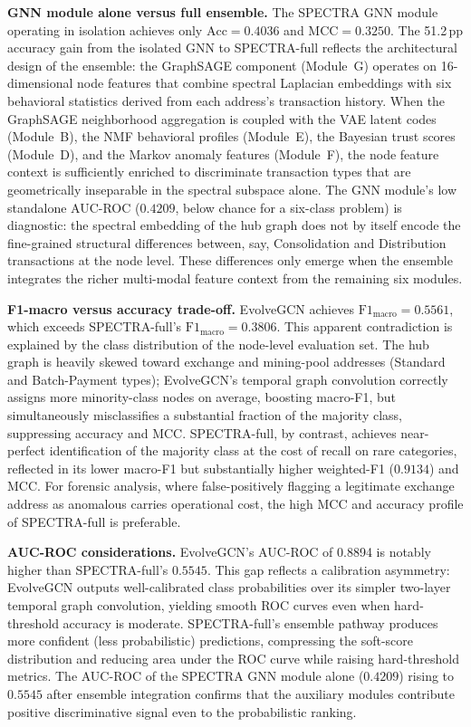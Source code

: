 \textbf{GNN module alone versus full ensemble.}
The SPECTRA GNN module operating in isolation achieves only
$\text{Acc} = \num{0.4036}$ and $\text{MCC} = \num{0.3250}$.
The \num{51.2}\,pp accuracy gain from the isolated GNN to SPECTRA-full
reflects the architectural design of the ensemble: the GraphSAGE component
(Module~G) operates on 16-dimensional node features that combine spectral
Laplacian embeddings with six behavioral statistics derived from each
address's transaction history.
When the GraphSAGE neighborhood aggregation is coupled with the VAE latent
codes (Module~B), the NMF behavioral profiles (Module~E), the Bayesian
trust scores (Module~D), and the Markov anomaly features (Module~F),
the node feature context is sufficiently enriched to discriminate
transaction types that are geometrically inseparable in the spectral
subspace alone.
The GNN module's low standalone AUC-ROC ($\num{0.4209}$, below chance for
a six-class problem) is diagnostic: the spectral embedding of the hub graph
does not by itself encode the fine-grained structural differences between,
say, Consolidation and Distribution transactions at the node level.
These differences only emerge when the ensemble integrates the richer
multi-modal feature context from the remaining six modules.

\textbf{F1-macro versus accuracy trade-off.}
EvolveGCN achieves $\text{F1}_{\text{macro}} = \num{0.5561}$, which
exceeds SPECTRA-full's $\text{F1}_{\text{macro}} = \num{0.3806}$.
This apparent contradiction is explained by the class distribution of the
node-level evaluation set.
The hub graph is heavily skewed toward exchange and mining-pool addresses
(Standard and Batch-Payment types); EvolveGCN's temporal graph convolution
correctly assigns more minority-class nodes on average, boosting macro-F1,
but simultaneously misclassifies a substantial fraction of the majority
class, suppressing accuracy and MCC.
SPECTRA-full, by contrast, achieves near-perfect identification of the
majority class at the cost of recall on rare categories, reflected in its
lower macro-F1 but substantially higher weighted-F1 ($\num{0.9134}$)
and MCC.
For forensic analysis, where false-positively flagging a legitimate exchange
address as anomalous carries operational cost, the high MCC and accuracy
profile of SPECTRA-full is preferable.

\textbf{AUC-ROC considerations.}
EvolveGCN's AUC-ROC of \num{0.8894} is notably higher than SPECTRA-full's
$\num{0.5545}$.
This gap reflects a calibration asymmetry: EvolveGCN outputs well-calibrated
class probabilities over its simpler two-layer temporal graph convolution,
yielding smooth ROC curves even when hard-threshold accuracy is moderate.
SPECTRA-full's ensemble pathway produces more confident (less probabilistic)
predictions, compressing the soft-score distribution and reducing area under
the ROC curve while raising hard-threshold metrics.
The AUC-ROC of the SPECTRA GNN module alone ($\num{0.4209}$) rising to
$\num{0.5545}$ after ensemble integration confirms that the auxiliary modules
contribute positive discriminative signal even to the probabilistic ranking.

